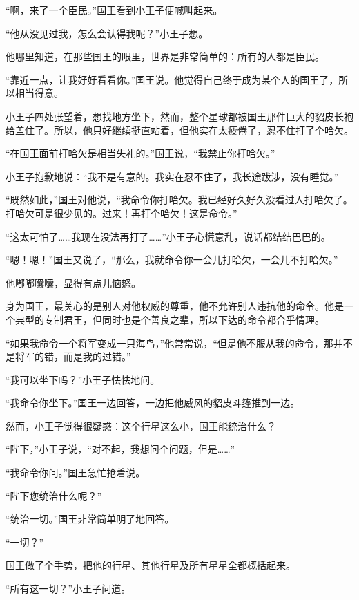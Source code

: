“啊，来了一个臣民。”国王看到小王子便喊叫起来。

“他从没见过我，怎么会认得我呢？”小王子想。

他哪里知道，在那些国王的眼里，世界是非常简单的：所有的人都是臣民。

{\startalignment[center]
 \stopalignment}

“靠近一点，让我好好看看你。”国王说。他觉得自己终于成为某个人的国王了，所以相当得意。

小王子四处张望着，想找地方坐下，然而，整个星球都被国王那件巨大的貂皮长袍给盖住了。所以，他只好继续挺直站着，但他实在太疲倦了，忍不住打了个哈欠。

“在国王面前打哈欠是相当失礼的。”国王说，“我禁止你打哈欠。”

小王子抱歉地说：“我不是有意的。我实在忍不住了，我长途跋涉，没有睡觉。”

“既然如此，”国王对他说，“我命令你打哈欠。我已经好久好久没看过人打哈欠了。打哈欠可是很少见的。过来！再打个哈欠！这是命令。”

“这太可怕了\ldots{}\ldots{}我现在没法再打了\ldots{}\ldots{}”小王子心慌意乱，说话都结结巴巴的。

“嗯！嗯！”国王又说了，“那么，我就命令你一会儿打哈欠，一会儿不打哈欠。”

他嘟嘟囔囔，显得有点儿恼怒。

身为国王，最关心的是别人对他权威的尊重，他不允许别人违抗他的命令。他是一个典型的专制君王，但同时也是个善良之辈，所以下达的命令都合乎情理。

“如果我命令一个将军变成一只海鸟，”他常常说，“但是他不服从我的命令，那并不是将军的错，而是我的过错。”

“我可以坐下吗？”小王子怯怯地问。

“我命令你坐下。”国王一边回答，一边把他威风的貂皮斗篷推到一边。

然而，小王子觉得很疑惑：这个行星这么小，国王能统治什么？

“陛下，”小王子说，“对不起，我想问个问题，但是\ldots{}\ldots{}”

“我命令你问。”国王急忙抢着说。

“陛下您统治什么呢？”

“统治一切。”国王非常简单明了地回答。

“一切？”

国王做了个手势，把他的行星、其他行星及所有星星全都概括起来。

“所有这一切？”小王子问道。

